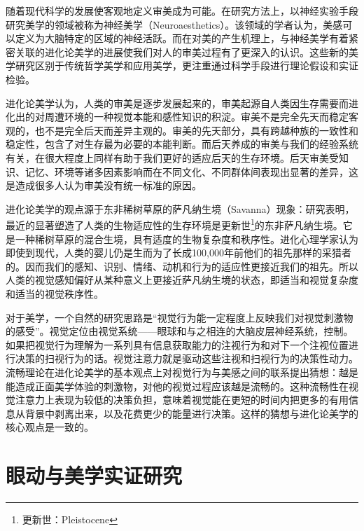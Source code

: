 随着现代科学的发展使客观地定义审美成为可能。在研究方法上，以神经实验手段研究美学的领域被称为神经美学（Neuroaesthetics）\cite{Cinzia2009, Jacobs2003, Cela2011}。该领域的学者认为，美感可以定义为大脑特定的区域的神经活跃\cite{Ramachandran1999}。而在对美的产生机理上，与神经美学有着紧密关联的进化论美学\cite{Stoddart1997}的进展使我们对人的审美过程有了更深入的认识。这些新的美学研究区别于传统哲学美学和应用美学，更注重通过科学手段进行理论假设和实证检验。

进化论美学认为，人类的审美是逐步发展起来的，审美起源自人类因生存需要而进化出的对周遭环境的一种视觉本能和感性知识的积淀\cite{Stoddart1997}。审美不是完全先天而稳定客观的，也不是完全后天而差异主观的。审美的先天部分，具有跨越种族的一致性和稳定性，包含了对生存最为必要的本能判断。而后天养成的审美与我们的经验系统有关，在很大程度上同样有助于我们更好的适应后天的生存环境。后天审美受知识、记忆、环境等诸多因素影响而在不同文化、不同群体间表现出显著的差异，这是造成很多人认为审美没有统一标准的原因。

进化论美学的观点源于东非稀树草原的萨凡纳生境（Savanna）现象\cite{Ruso2003}：研究表明，最近的显著塑造了人类的生物适应性的生存环境是更新世\footnote{更新世：Pleistocene}的东非萨凡纳生境。它是一种稀树草原的混合生境，具有适度的生物复杂度和秩序性。进化心理学家认为即使到现代，人类的婴儿仍是生而为了长成100,000年前他们的祖先那样的采猎者的。因而我们的感知、识别、情绪、动机和行为的适应性更接近我们的祖先\cite{Miller1994}。所以人类的视觉感知偏好从某种意义上更接近萨凡纳生境的状态，即适当和视觉复杂度和适当的视觉秩序性。

对于美学，一个自然的研究思路是“视觉行为能一定程度上反映我们对视觉刺激物的感受”。视觉定位由视觉系统——眼球和与之相连的大脑皮层神经系统，控制。如果把视觉行为理解为一系列具有信息获取能力的注视行为和对下一个注视位置进行决策的扫视行为的话。视觉注意力就是驱动这些注视和扫视行为的决策性动力。流畅理论\cite{Reber2004, Reber2012}在进化论美学的基本观点上对视觉行为与美感之间的联系提出猜想：越是能造成正面美学体验的刺激物，对他的视觉过程应该越是流畅的。这种流畅性在视觉注意力上表现为较低的决策负担，意味着视觉能在更短的时间内把更多的有用信息从背景中剥离出来，以及花费更少的能量进行决策。这样的猜想与进化论美学的核心观点是一致的。

\section{眼动与美学实证研究}

